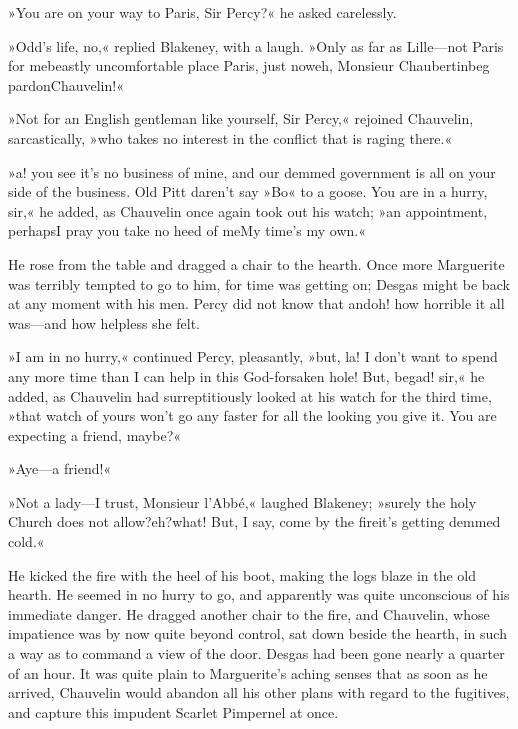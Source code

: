 »You are on your way to Paris, Sir Percy?« he asked carelessly.

»Odd's life, no,« replied Blakeney, with a laugh. »Only as far as Lille—not Paris for me\textellipsis \allowbreak  beastly uncomfortable place Paris, just now\textellipsis \allowbreak  eh, Monsieur Chaubertin\textellipsis \allowbreak  beg pardon\textellipsis \allowbreak  Chauvelin!«

»Not for an English gentleman like yourself, Sir Percy,« rejoined Chauvelin, sarcastically, »who takes no interest in the conflict that is raging there.«

»a! you see it's no business of mine, and our demmed government is all on your side of the business. Old Pitt daren't say »Bo« to a goose. You are in a hurry, sir,« he added, as Chauvelin once again took out his watch; »an appointment, perhaps\textellipsis \allowbreak  I pray you take no heed of me\textellipsis \allowbreak  My time's my own.«

He rose from the table and dragged a chair to the hearth. Once more Marguerite was terribly tempted to go to him, for time was getting on; Desgas might be back at any moment with his men. Percy did not know that and\textellipsis \allowbreak  oh! how horrible it all was—and how helpless she felt.

»I am in no hurry,« continued Percy, pleasantly, »but, la! I don't want to spend any more time than I can help in this God-forsaken hole! But, begad! sir,« he added, as Chauvelin had surreptitiously looked at his watch for the third time, »that watch of yours won't go any faster for all the looking you give it. You are expecting a friend, maybe?«

»Aye—a friend!«

»Not a lady—I trust, Monsieur l'Abbé,« laughed Blakeney; »surely the holy Church does not allow?\textellipsis \allowbreak  eh?\textellipsis \allowbreak  what! But, I say, come by the fire\textellipsis \allowbreak  it's getting demmed cold.«

He kicked the fire with the heel of his boot, making the logs blaze in the old hearth. He seemed in no hurry to go, and apparently was quite unconscious of his immediate danger. He dragged another chair to the fire, and Chauvelin, whose impatience was by now quite beyond control, sat down beside the hearth, in such a way as to command a view of the door. Desgas had been gone nearly a quarter of an hour. It was quite plain to Marguerite's aching senses that as soon as he arrived, Chauvelin would abandon all his other plans with regard to the fugitives, and capture this impudent Scarlet Pimpernel at once.

